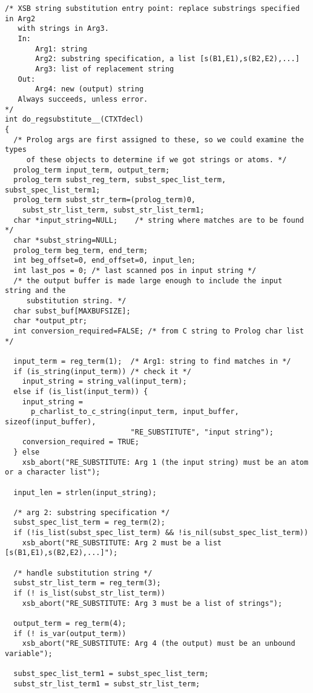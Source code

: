 {\small 
\begin{verbatim}
/* XSB string substitution entry point: replace substrings specified in Arg2
   with strings in Arg3.
   In: 
       Arg1: string
       Arg2: substring specification, a list [s(B1,E1),s(B2,E2),...]
       Arg3: list of replacement string
   Out:
       Arg4: new (output) string
   Always succeeds, unless error.
*/
int do_regsubstitute__(CTXTdecl)
{
  /* Prolog args are first assigned to these, so we could examine the types
     of these objects to determine if we got strings or atoms. */
  prolog_term input_term, output_term;
  prolog_term subst_reg_term, subst_spec_list_term, subst_spec_list_term1;
  prolog_term subst_str_term=(prolog_term)0,
    subst_str_list_term, subst_str_list_term1;
  char *input_string=NULL;    /* string where matches are to be found */
  char *subst_string=NULL;
  prolog_term beg_term, end_term;
  int beg_offset=0, end_offset=0, input_len;
  int last_pos = 0; /* last scanned pos in input string */
  /* the output buffer is made large enough to include the input string and the
     substitution string. */
  char subst_buf[MAXBUFSIZE];
  char *output_ptr;
  int conversion_required=FALSE; /* from C string to Prolog char list */

  input_term = reg_term(1);  /* Arg1: string to find matches in */
  if (is_string(input_term)) /* check it */
    input_string = string_val(input_term);
  else if (is_list(input_term)) {
    input_string =
      p_charlist_to_c_string(input_term, input_buffer, sizeof(input_buffer),
                             "RE_SUBSTITUTE", "input string");
    conversion_required = TRUE;
  } else
    xsb_abort("RE_SUBSTITUTE: Arg 1 (the input string) must be an atom or a character list");

  input_len = strlen(input_string);

  /* arg 2: substring specification */
  subst_spec_list_term = reg_term(2);
  if (!is_list(subst_spec_list_term) && !is_nil(subst_spec_list_term))
    xsb_abort("RE_SUBSTITUTE: Arg 2 must be a list [s(B1,E1),s(B2,E2),...]");

  /* handle substitution string */
  subst_str_list_term = reg_term(3);
  if (! is_list(subst_str_list_term))
    xsb_abort("RE_SUBSTITUTE: Arg 3 must be a list of strings");

  output_term = reg_term(4);
  if (! is_var(output_term))
    xsb_abort("RE_SUBSTITUTE: Arg 4 (the output) must be an unbound variable");

  subst_spec_list_term1 = subst_spec_list_term;
  subst_str_list_term1 = subst_str_list_term;


\end{verbatim}}
